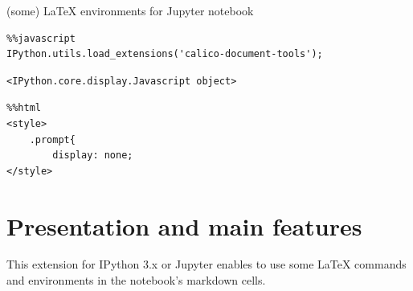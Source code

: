 
    
    
    
    


    

    
    (some) LaTeX environments for Jupyter notebook
\begin{lstlisting}
%%javascript 
IPython.utils.load_extensions('calico-document-tools');
\end{lstlisting}%
%
    
    \begin{verbatim}
<IPython.core.display.Javascript object>
    \end{verbatim}

\begin{lstlisting}
%%html
<style>
    .prompt{
        display: none;
</style>
\end{lstlisting}
    \section{Presentation and main
features}\label{presentation-and-main-features}

    This extension for IPython 3.x or Jupyter enables to use some LaTeX
commands and environments in the notebook's markdown cells.

